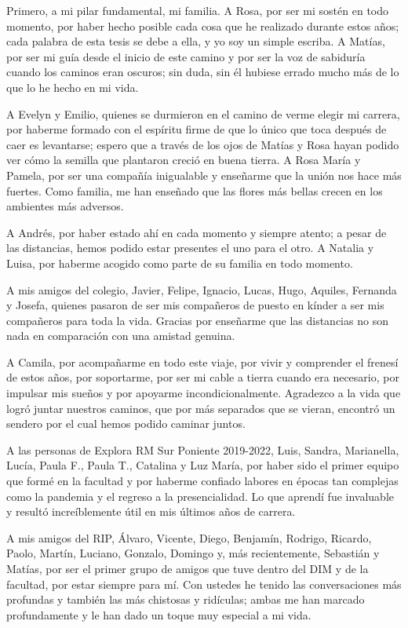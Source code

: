 Primero, a mi pilar fundamental, mi familia. A Rosa, por ser mi sostén en todo momento, por haber hecho posible cada cosa que he realizado durante estos años; cada palabra de esta tesis se debe a ella, y yo soy un simple escriba. A Matías, por ser mi guía desde el inicio de este camino y por ser la voz de sabiduría cuando los caminos eran oscuros; sin duda, sin él hubiese errado mucho más de lo que lo he hecho en mi vida.

A Evelyn y Emilio, quienes se durmieron en el camino de verme elegir mi carrera, por haberme formado con el espíritu firme de que lo único que toca después de caer es levantarse; espero que a través de los ojos de Matías y Rosa hayan podido ver cómo la semilla que plantaron creció en buena tierra. A Rosa María y Pamela, por ser una compañía inigualable y enseñarme que la unión nos hace más fuertes. Como familia, me han enseñado que las flores más bellas crecen en los ambientes más adversos.

A Andrés, por haber estado ahí en cada momento y siempre atento; a pesar de las distancias, hemos podido estar presentes el uno para el otro. A Natalia y Luisa, por haberme acogido como parte de su familia en todo momento.

A mis amigos del colegio, Javier, Felipe, Ignacio, Lucas, Hugo, Aquiles, Fernanda y Josefa, quienes pasaron de ser mis compañeros de puesto en kínder a ser mis compañeros para toda la vida. Gracias por enseñarme que las distancias no son nada en comparación con una amistad genuina.

A Camila, por acompañarme en todo este viaje, por vivir y comprender el frenesí de estos años, por soportarme, por ser mi cable a tierra cuando era necesario, por impulsar mis sueños y por apoyarme incondicionalmente. Agradezco a la vida que logró juntar nuestros caminos, que por más separados que se vieran, encontró un sendero por el cual hemos podido caminar juntos.

A las personas de Explora RM Sur Poniente 2019-2022, Luis, Sandra, Marianella, Lucía, Paula F., Paula T., Catalina y Luz María, por haber sido el primer equipo que formé en la facultad y por haberme confiado labores en épocas tan complejas como la pandemia y el regreso a la presencialidad. Lo que aprendí fue invaluable y resultó increíblemente útil en mis últimos años de carrera.

A mis amigos del RIP, Álvaro, Vicente, Diego, Benjamín, Rodrigo, Ricardo, Paolo, Martín, Luciano, Gonzalo, Domingo y, más recientemente, Sebastián y Matías, por ser el primer grupo de amigos que tuve dentro del DIM y de la facultad, por estar siempre para mí. Con ustedes he tenido las conversaciones más profundas y también las más chistosas y ridículas; ambas me han marcado profundamente y le han dado un toque muy especial a mi vida.


